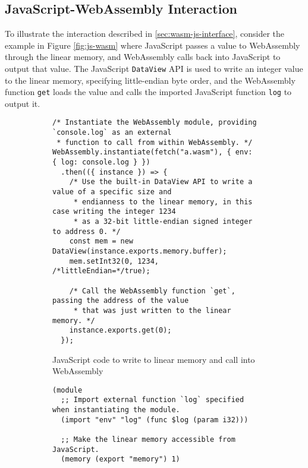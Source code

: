 \begin{appendices}

\chapter{JavaScript-WebAssembly Interaction}

\label{appendix:shared-memory}

To illustrate the interaction described in \ref{sec:wasm-js-interface}, consider the example in Figure \ref{fig:js-wasm} where JavaScript passes a value to WebAssembly through the linear memory, and WebAssembly calls back into JavaScript to output that value. The JavaScript \texttt{DataView} API is used to write an integer value to the linear memory, specifying little-endian byte order, and the WebAssembly function \texttt{get} loads the value and calls the imported JavaScript function \texttt{log} to output it.

\begin{figure}[H]
\centering
\begin{subfigure}{\textwidth}
\begin{verbatim}
/* Instantiate the WebAssembly module, providing `console.log` as an external
 * function to call from within WebAssembly. */
WebAssembly.instantiate(fetch("a.wasm"), { env: { log: console.log } })
  .then(({ instance }) => {
    /* Use the built-in DataView API to write a value of a specific size and
     * endianness to the linear memory, in this case writing the integer 1234
     * as a 32-bit little-endian signed integer to address 0. */
    const mem = new DataView(instance.exports.memory.buffer);
    mem.setInt32(0, 1234, /*littleEndian=*/true);

    /* Call the WebAssembly function `get`, passing the address of the value
     * that was just written to the linear memory. */
    instance.exports.get(0);
  });
\end{verbatim}
\caption{JavaScript code to write to linear memory and call into WebAssembly}
\end{subfigure}
\par\bigskip
\par\bigskip
\begin{subfigure}{\textwidth}
\begin{verbatim}
(module
  ;; Import external function `log` specified when instantiating the module.
  (import "env" "log" (func $log (param i32)))

  ;; Make the linear memory accessible from JavaScript.
  (memory (export "memory") 1)


\end{verbatim}
\end{subfigure}
\end{figure}
\end{appendices}

